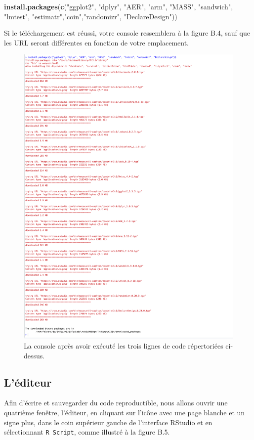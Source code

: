 \documentclass[12pt,]{book}
\newenvironment{Shaded}{\begin{snugshade}}{\end{snugshade}}
\newcommand{\KeywordTok}[1]{\textcolor[rgb]{0.13,0.29,0.53}{\textbf{#1}}}
\newcommand{\NormalTok}[1]{#1}
\newcommand{\StringTok}[1]{\textcolor[rgb]{0.31,0.60,0.02}{#1}}
\begin{document}
\begin{Shaded}
\begin{Highlighting}[]
\KeywordTok{install.packages}\NormalTok{(}\KeywordTok{c}\NormalTok{(}\StringTok{"ggplot2"}\NormalTok{, }\StringTok{"dplyr"}\NormalTok{, }\StringTok{"AER"}\NormalTok{, }\StringTok{"arm"}\NormalTok{, }\StringTok{"MASS"}\NormalTok{, }\StringTok{"sandwich"}\NormalTok{, }
                   \StringTok{"lmtest"}\NormalTok{, }\StringTok{"estimatr"}\NormalTok{,}\StringTok{"coin"}\NormalTok{,}\StringTok{"randomizr"}\NormalTok{, }\StringTok{"DeclareDesign"}\NormalTok{))}
\end{Highlighting}
\end{Shaded}

Si le téléchargement est réussi, votre console ressemblera à la figure B.4, sauf que les URL seront différentes en fonction de votre emplacement.

\begin{figure}
\includegraphics[width=0.4\linewidth]{Images/console2a} \caption{La console après avoir exécuté les trois lignes de code répertoriées ci-dessus.}\label{fig:console2}
\end{figure}

\hypertarget{luxe9diteur}{%
\subsection{L'éditeur}\label{luxe9diteur}}

Afin d'écrire et sauvegarder du code reproductible, nous allons ouvrir une quatrième fenêtre, l'éditeur, en cliquant sur l'icône avec une page blanche et un signe plus, dans le coin supérieur gauche de l'interface RStudio et en sélectionnant \texttt{R\ Script}, comme illustré à la figure B.5.
\end{document}
